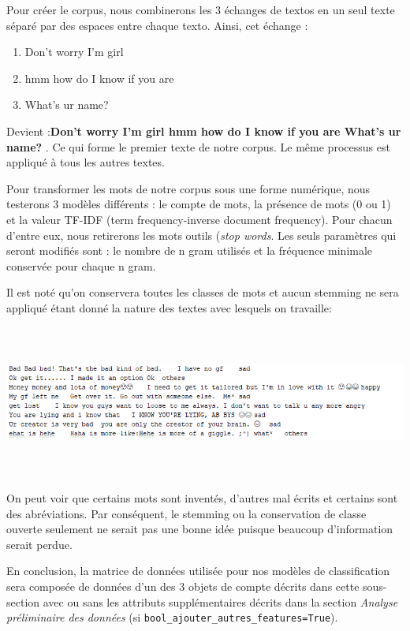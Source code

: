 Pour créer le corpus, nous combinerons les 3 échanges de textos en un seul texte séparé par des espaces entre chaque texto. Ainsi, cet échange :
\begin{enumerate}
\item Don't worry  I'm girl
\item hmm how do I know if you are
\item What's ur name?
\end{enumerate}
Devient :\textbf{Don't worry  I'm girl hmm how do I know if you are  What's ur name?} . Ce qui forme le premier texte de notre corpus. Le même processus est appliqué à tous les autres textes.

Pour transformer les mots de notre corpus sous une forme numérique, nous testerons 3 modèles différents : le compte de mots, la présence de mots (0 ou 1) et la valeur TF-IDF (term frequency-inverse document frequency). Pour chacun d'entre eux, nous retirerons les mots outils (\emph{stop words}. Les seuls paramètres qui seront modifiés sont : le nombre de n gram utilisés et la fréquence minimale conservée pour chaque n gram.

Il est noté qu'on conservera toutes les classes de mots et aucun stemming ne sera appliqué étant donné la nature des textes avec lesquels on travaille:

\includegraphics[width=\linewidth,height=5cm]{images/exemples_text}

On peut voir que certains mots sont inventés, d'autres mal écrits et certains sont des abréviations. Par conséquent, le stemming ou la conservation de classe ouverte seulement ne serait pas une bonne idée puisque beaucoup d'information serait perdue.

En conclusion, la matrice de données utilisée pour nos modèles de classification sera composée de données d'un des 3 objets de compte décrits dans cette sous-section avec ou sans les attributs supplémentaires décrits dans la section \emph{Analyse préliminaire des données} (si \verb|bool_ajouter_autres_features=True|).